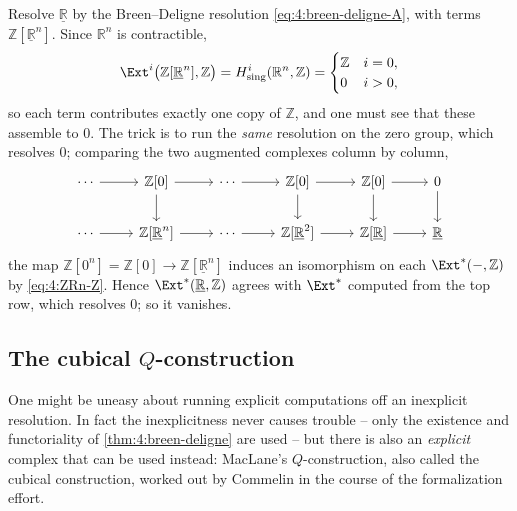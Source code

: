 \begin{example}[$\Ext^{i}(\mathbb{R},\mathbb{Z})=0$, worked out]
\label{ex:4:R-Z-worked}
Resolve $\underline{\mathbb{R}}$ by the Breen--Deligne resolution
\eqref{eq:4:breen-deligne-A}, with terms $\mathbb{Z}[\underline{\mathbb{R}}^{n}]$.
Since $\mathbb{R}^{n}$ is contractible,
\begin{equation}
\label{eq:4:ZRn-Z}
\Ext^{i}\bigl(\mathbb{Z}[\underline{\mathbb{R}}^{n}],\mathbb{Z}\bigr)
=H^{i}_{\mathrm{sing}}(\mathbb{R}^{n},\mathbb{Z})=
\begin{cases}
\mathbb{Z} & i=0,\\
0 & i>0,
\end{cases}
\end{equation}
so each term contributes exactly one copy of $\mathbb{Z}$, and one must see that
these assemble to $0$. The trick is to run the \emph{same} resolution on the zero
group, which resolves $0$; comparing the two augmented complexes column by
column,
\[
\begin{tikzcd}
\cdots \arrow[r] & \mathbb{Z}[0] \arrow[r] \arrow[d] & \cdots \arrow[r] & \mathbb{Z}[0] \arrow[r] \arrow[d] & \mathbb{Z}[0] \arrow[r] \arrow[d] & 0 \arrow[d] \\
\cdots \arrow[r] & \mathbb{Z}[\underline{\mathbb{R}}^{n}] \arrow[r] & \cdots \arrow[r] & \mathbb{Z}[\underline{\mathbb{R}}^{2}] \arrow[r] & \mathbb{Z}[\underline{\mathbb{R}}] \arrow[r] & \underline{\mathbb{R}}
\end{tikzcd}
\]
the map $\mathbb{Z}[0^{n}]=\mathbb{Z}[0]\to\mathbb{Z}[\underline{\mathbb{R}}^{n}]$
induces an isomorphism on each $\Ext^{\ast}(-,\mathbb{Z})$ by \eqref{eq:4:ZRn-Z}.
Hence $\Ext^{\ast}(\underline{\mathbb{R}},\mathbb{Z})$ agrees with
$\Ext^{\ast}$ computed from the top row, which resolves $0$; so it vanishes.
\end{example}

\subsection{The cubical \texorpdfstring{$Q$}{Q}-construction}

One might be uneasy about running explicit computations off an inexplicit
resolution. In fact the inexplicitness never causes trouble -- only the
existence and functoriality of \cref{thm:4:breen-deligne} are used -- but there
is also an \emph{explicit} complex that can be used instead: MacLane's
$Q$-construction, also called the cubical construction, worked out by Commelin in
the course of the formalization effort.

